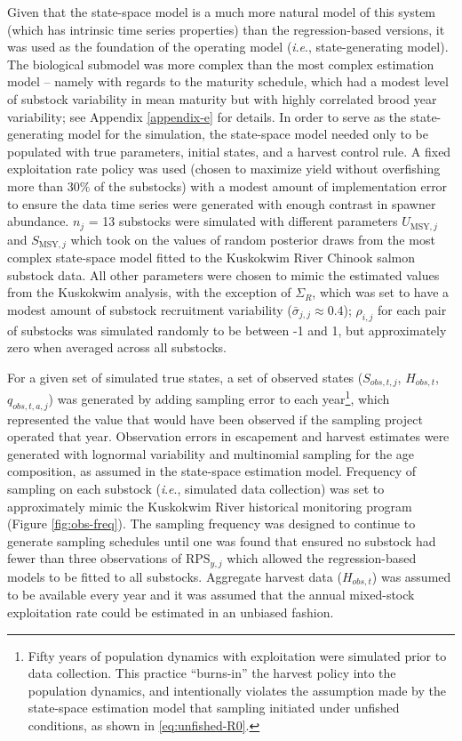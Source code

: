 \documentclass[12pt,]{book}
\let\rmarkdownfootnote\footnote%
\def\footnote{\protect\rmarkdownfootnote}
\theoremstyle{definition}
\theoremstyle{definition}
\theoremstyle{definition}
\theoremstyle{remark}
\begin{document}
Given that the state-space model is a much more natural model of this
system (which has intrinsic time series properties) than the
regression-based versions, it was used as the foundation of the
operating model (\emph{i}.\emph{e}., state-generating model). The
biological submodel was more complex than the most complex estimation
model -- namely with regards to the maturity schedule, which had a
modest level of substock variability in mean maturity but with highly
correlated brood year variability; see Appendix \ref{appendix-e} for
details. In order to serve as the state-generating model for the
simulation, the state-space model needed only to be populated with true
parameters, initial states, and a harvest control rule. A fixed
exploitation rate policy was used (chosen to maximize yield without
overfishing more than 30\% of the substocks) with a modest amount of
implementation error to ensure the data time series were generated with
enough contrast in spawner abundance. \(n_j\) = 13 substocks were
simulated with different parameters \(U_{\text{MSY},j}\) and
\(S_{\text{MSY},j}\) which took on the values of random posterior draws
from the most complex state-space model fitted to the Kuskokwim River
Chinook salmon substock data. All other parameters were chosen to mimic
the estimated values from the Kuskokwim analysis, with the exception of
\(\Sigma_R\), which was set to have a modest amount of substock
recruitment variability (\(\bar{\sigma}_{j,j} \approx 0.4\));
\(\rho_{i,j}\) for each pair of substocks was simulated randomly to be
between -1 and 1, but approximately zero when averaged across all
substocks.

For a given set of simulated true states, a set of observed states
(\(S_{obs,t,j}\), \(H_{obs,t}\), \(q_{obs,t,a,j}\)) was generated by
adding sampling error to each year\footnote{Fifty years of population
  dynamics with exploitation were simulated prior to data collection.
  This practice ``burns-in'' the harvest policy into the population
  dynamics, and intentionally violates the assumption made by the
  state-space estimation model that sampling initiated under unfished
  conditions, as shown in \eqref{eq:unfished-R0}.}, which represented the
value that would have been observed if the sampling project operated
that year. Observation errors in escapement and harvest estimates were
generated with lognormal variability and multinomial sampling for the
age composition, as assumed in the state-space estimation model.
Frequency of sampling on each substock (\emph{i}.\emph{e}., simulated
data collection) was set to approximately mimic the Kuskokwim River
historical monitoring program (Figure \ref{fig:obs-freq}). The sampling
frequency was designed to continue to generate sampling schedules until
one was found that ensured no substock had fewer than three observations
of \(\text{RPS}_{y,j}\) which allowed the regression-based models to be
fitted to all substocks. Aggregate harvest data (\(H_{obs,t}\)) was
assumed to be available every year and it was assumed that the annual
mixed-stock exploitation rate could be estimated in an unbiased fashion.
\end{document}
